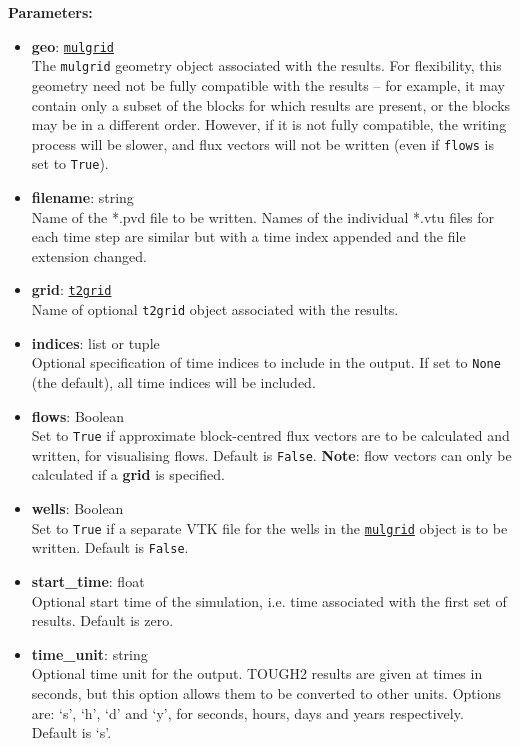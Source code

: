 \textbf{Parameters:}
\begin{itemize}
\item \textbf{geo}: \hyperref[mulgrids]{\texttt{mulgrid}}\\
  The \texttt{mulgrid} geometry object associated with the results.  For flexibility, this geometry need not be fully compatible with the results -- for example, it may contain only a subset of the blocks for which results are present, or the blocks may be in a different order.  However, if it is not fully compatible, the writing process will be slower, and flux vectors will not be written (even if \texttt{flows} is set to \texttt{True}).
\item \textbf{filename}: string\\
  Name of the *.pvd file to be written.  Names of the individual *.vtu files for each time step are similar but with a time index appended and the file extension changed.
\item \textbf{grid}: \hyperref[t2grids]{\texttt{t2grid}}\\
  Name of optional \texttt{t2grid} object associated with the results.
\item \textbf{indices}: list or tuple\\
  Optional specification of time indices to include in the output.  If set to \texttt{None} (the default), all time indices will be included.
\item \textbf{flows}: Boolean\\
  Set to \texttt{True} if approximate block-centred flux vectors are to be calculated and written, for visualising flows.  Default is \texttt{False}.  \textbf{Note}: flow vectors can only be calculated if a \textbf{grid} is specified.
\item \textbf{wells}: Boolean\\
  Set to \texttt{True} if a separate VTK file for the wells in the \hyperref[mulgrids]{\texttt{mulgrid}} object is to be written.  Default is \texttt{False}.
\item \textbf{start\_time}: float\\
  Optional start time of the simulation, i.e. time associated with the first set of results.  Default is zero.
\item \textbf{time\_unit}: string\\
  Optional time unit for the output.  TOUGH2 results are given at times in seconds, but this option allows them to be converted to other units.  Options are: `s', `h', `d' and `y', for seconds, hours, days and years respectively.  Default is `s'.

\end{itemize}
